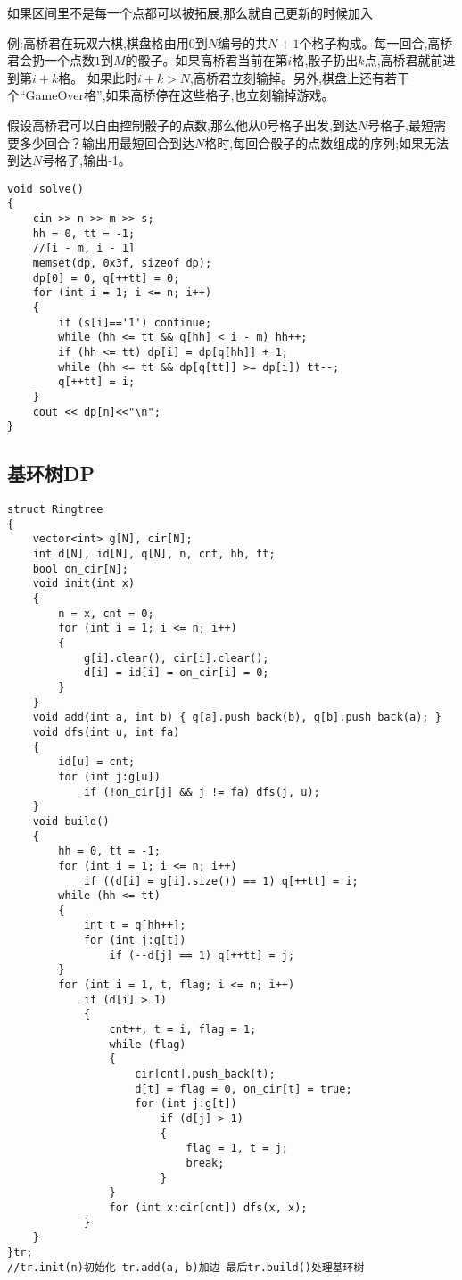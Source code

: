 \documentclass[a4paper,fontset=none]{ctexart}
\begin{document}
如果区间里不是每一个点都可以被拓展,那么就自己更新的时候加入

例:高桥君在玩双六棋,棋盘格由用$0$到$N$编号的共$N+1$个格子构成。每一回合,高桥君会扔一个点数$1$到$M$的骰子。如果高桥君当前在第$i$格,骰子扔出$k$点,高桥君就前进到第$i+k$格。 如果此时$i+k > N$,高桥君立刻输掉。另外,棋盘上还有若干个“GameOver格”,如果高桥停在这些格子,也立刻输掉游戏。

假设高桥君可以自由控制骰子的点数,那么他从$0$号格子出发,到达$N$号格子,最短需要多少回合？输出用最短回合到达$N$格时,每回合骰子的点数组成的序列;如果无法到达$N$号格子,输出-1。

\begin{verbatim}
void solve()
{
    cin >> n >> m >> s;
    hh = 0, tt = -1;
    //[i - m, i - 1]
    memset(dp, 0x3f, sizeof dp);
    dp[0] = 0, q[++tt] = 0;
    for (int i = 1; i <= n; i++)
    {
        if (s[i]=='1') continue;
        while (hh <= tt && q[hh] < i - m) hh++;
        if (hh <= tt) dp[i] = dp[q[hh]] + 1;
        while (hh <= tt && dp[q[tt]] >= dp[i]) tt--;
        q[++tt] = i;
    }
    cout << dp[n]<<"\n";
}
\end{verbatim}
\subsection{基环树DP}

\begin{verbatim}
struct Ringtree
{
    vector<int> g[N], cir[N];
    int d[N], id[N], q[N], n, cnt, hh, tt;
    bool on_cir[N];
    void init(int x)
    {
        n = x, cnt = 0;
        for (int i = 1; i <= n; i++)
        {
            g[i].clear(), cir[i].clear();
            d[i] = id[i] = on_cir[i] = 0;
        }
    }
    void add(int a, int b) { g[a].push_back(b), g[b].push_back(a); }
    void dfs(int u, int fa)
    {
        id[u] = cnt;
        for (int j:g[u])
            if (!on_cir[j] && j != fa) dfs(j, u);
    }
    void build()
    {
        hh = 0, tt = -1;
        for (int i = 1; i <= n; i++)
            if ((d[i] = g[i].size()) == 1) q[++tt] = i;
        while (hh <= tt)
        {
            int t = q[hh++];
            for (int j:g[t])
                if (--d[j] == 1) q[++tt] = j;
        }
        for (int i = 1, t, flag; i <= n; i++)
            if (d[i] > 1)
            {
                cnt++, t = i, flag = 1;
                while (flag)
                {
                    cir[cnt].push_back(t);
                    d[t] = flag = 0, on_cir[t] = true;
                    for (int j:g[t])
                        if (d[j] > 1)
                        {
                            flag = 1, t = j;
                            break;
                        }
                }
                for (int x:cir[cnt]) dfs(x, x);
            }
    }
}tr;
//tr.init(n)初始化 tr.add(a, b)加边 最后tr.build()处理基环树
\end{verbatim}
\end{document}
